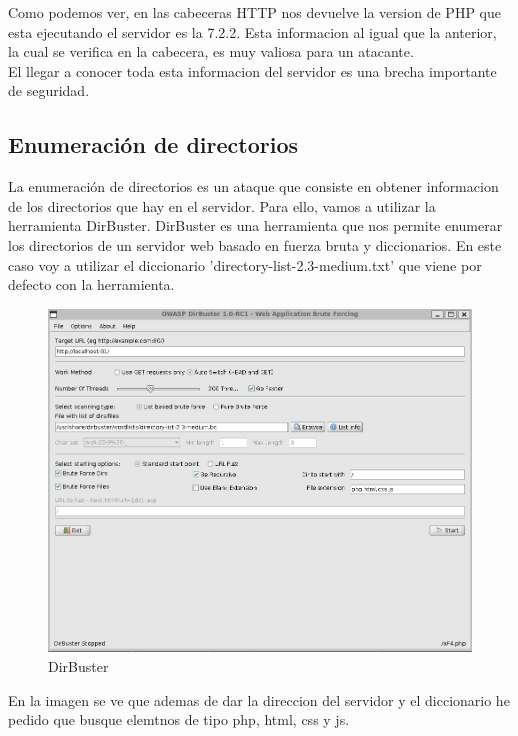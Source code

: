 \documentclass{report}
\begin{document}
                Como podemos ver, en las cabeceras HTTP nos devuelve la version de PHP que esta ejecutando el servidor es la 7.2.2.
                Esta informacion al igual que la anterior, la cual se verifica en la cabecera, es muy valiosa para un atacante.\\

                El llegar a conocer toda esta informacion del servidor es una brecha importante de seguridad.

            \clearpage
            \subsection{Enumeración de directorios}
                La enumeración de directorios es un ataque que consiste en obtener informacion de los directorios que hay en el servidor.
                Para ello, vamos a utilizar la herramienta DirBuster.
                DirBuster es una herramienta que nos permite enumerar los directorios de un servidor web basado en fuerza bruta y diccionarios.
                En este caso voy a utilizar el diccionario 'directory-list-2.3-medium.txt' que viene por defecto con la herramienta.
                \begin{figure}[H]
                    \centering
                    \includegraphics[width=1\textwidth]{./img/vulnerabilidades/2.4/2.1.png}
                    \caption{DirBuster}
                \end{figure}
                En la imagen se ve que ademas de dar la direccion del servidor y el diccionario he pedido que busque elemtnos de tipo php, html, css y js.
\end{document}
